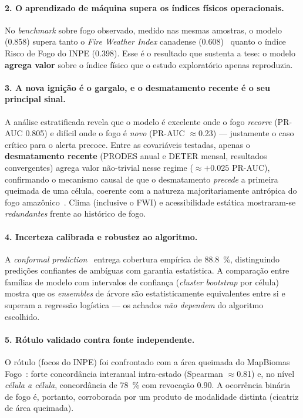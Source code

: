 \documentclass[tcc2]{uftex}
\begin{document}
\paragraph{2. O aprendizado de máquina supera os índices físicos operacionais.} No \emph{benchmark} sobre fogo observado, medido nas mesmas amostras, o modelo (\num{0,858}) supera tanto o \emph{Fire Weather Index} canadense (\num{0,608})~\cite{vanwagner1985fwi} quanto o índice Risco de Fogo do INPE (\num{0,398}). Esse é o resultado que sustenta a tese: o modelo \textbf{agrega valor} sobre o índice físico que o estudo exploratório apenas reproduzia.

\paragraph{3. A nova ignição é o gargalo, e o desmatamento recente é o seu principal sinal.} A análise estratificada revela que o modelo é excelente onde o fogo \emph{recorre} (PR-AUC \num{0,805}) e difícil onde o fogo é \emph{novo} (PR-AUC \(\approx\)\num{0,23}) --- justamente o caso crítico para o alerta precoce. Entre as covariáveis testadas, apenas o \textbf{desmatamento recente} (PRODES anual e DETER mensal, resultados convergentes) agrega valor não-trivial nesse regime (\(\approx +\num{0,025}\) PR-AUC), confirmando o mecanismo causal de que o desmatamento \emph{precede} a primeira queimada de uma célula, coerente com a natureza majoritariamente antrópica do fogo amazônico~\cite{aragao2018amazon}. Clima (inclusive o FWI) e acessibilidade estática mostraram-se \emph{redundantes} frente ao histórico de fogo.

\paragraph{4. Incerteza calibrada e robustez ao algoritmo.} A \emph{conformal prediction}~\cite{sadinle2019lac} entrega cobertura empírica de \SI{88,8}{\percent}, distinguindo predições confiantes de ambíguas com garantia estatística. A comparação entre famílias de modelo com intervalos de confiança (\emph{cluster bootstrap} por célula) mostra que os \emph{ensembles} de árvore são estatisticamente equivalentes entre si e superam a regressão logística --- os achados \emph{não dependem} do algoritmo escolhido.

\paragraph{5. Rótulo validado contra fonte independente.} O rótulo (focos do INPE) foi confrontado com a área queimada do MapBiomas Fogo~\cite{mapbiomasfogo}: forte concordância interanual intra-estado (Spearman \(\approx\)\num{0,81}) e, no nível \emph{célula a célula}, concordância de \SI{78}{\percent} com revocação \num{0,90}. A ocorrência binária de fogo é, portanto, corroborada por um produto de modalidade distinta (cicatriz de área queimada).
\end{document}
